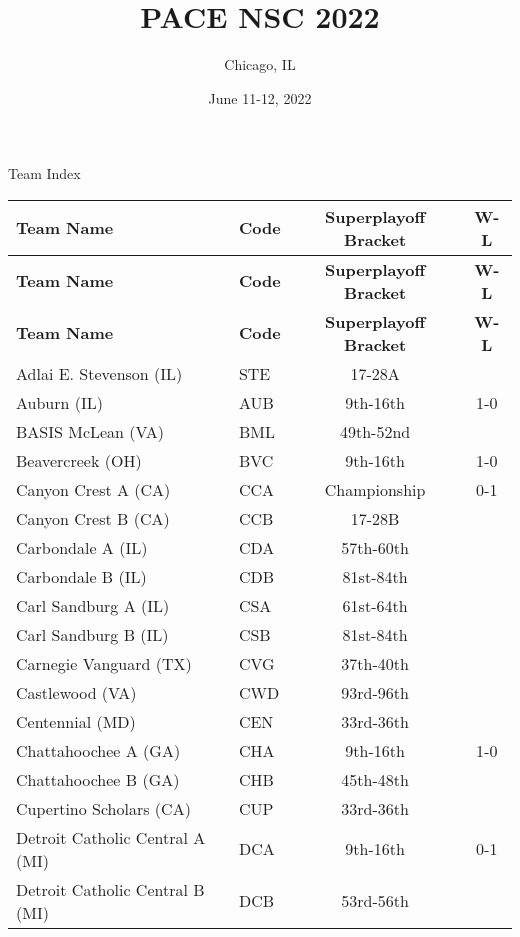 \documentclass{article}%
\title{PACE NSC 2022}%
\author{Chicago, IL}%
\date{June 11{-}12, 2022}%
\begin{document}
%
\normalsize%
%
\maketitle%
\vspace*{48pt}%
\begin{center}%
\begin{Huge}%
Team Index%
\end{Huge}%
\end{center}%
\newpage%
%
%
\begin{longtable}{|ll|c|c|}%
\rowcolor{gray!30}%
\hline%
\textbf{Team Name} & \textbf{Code}&\textbf{Superplayoff Bracket}&\textbf{W-L}\\%
\hline%
\endhead%
\hline%
\rowcolor{gray!25}%
\textbf{Team Name} & \textbf{Code}&\textbf{Superplayoff Bracket}&\textbf{W-L}\\%
\hline%
\endfoot%
\hline%
\hline\rowcolor{gray!25}%
\textbf{Team Name} & \textbf{Code}&\textbf{Superplayoff Bracket}&\textbf{W-L}\\%
\hline%
\endlastfoot%
\hline%
Adlai E. Stevenson (IL)&STE&17{-}28A&\\%
Auburn (IL)&AUB&9th{-}16th&1{-}0\\%
BASIS McLean (VA)&BML&49th{-}52nd&\\%
Beavercreek (OH)&BVC&9th{-}16th&1{-}0\\%
Canyon Crest A (CA)&CCA&Championship&0{-}1\\%
Canyon Crest B (CA)&CCB&17{-}28B&\\%
Carbondale A (IL)&CDA&57th{-}60th&\\%
Carbondale B (IL)&CDB&81st{-}84th&\\%
Carl Sandburg A (IL)&CSA&61st{-}64th&\\%
Carl Sandburg B (IL)&CSB&81st{-}84th&\\%
Carnegie Vanguard (TX)&CVG&37th{-}40th&\\%
Castlewood (VA)&CWD&93rd{-}96th&\\%
Centennial (MD)&CEN&33rd{-}36th&\\%
Chattahoochee A (GA)&CHA&9th{-}16th&1{-}0\\%
Chattahoochee B (GA)&CHB&45th{-}48th&\\%
Cupertino Scholars (CA)&CUP&33rd{-}36th&\\%
Detroit Catholic Central A (MI)&DCA&9th{-}16th&0{-}1\\%
Detroit Catholic Central B (MI)&DCB&53rd{-}56th&\\%

\end{longtable}
\end{document}
